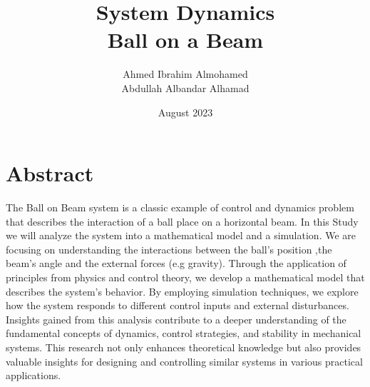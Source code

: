 \documentclass{article}
\title{System Dynamics \\ Ball on a Beam}
\author{Ahmed Ibrahim Almohamed \\  Abdullah Albandar Alhamad }
\date{August 2023}
\begin{document}
\tableofcontents
\maketitle
\makenomenclature
\section{Abstract}

The Ball on Beam system is a classic example of control and dynamics problem that describes
the interaction of a ball place on a horizontal beam.
In this Study we will analyze the system into a mathematical model and a simulation.
We are focusing on understanding the interactions between the ball's position ,the beam's angle
and the external forces (e.g gravity).
Through the application of principles from physics and control theory,
we develop a mathematical model that describes the system's behavior.
By employing simulation techniques, we explore how the system responds to different control inputs and external disturbances.
Insights gained from this analysis contribute to a deeper understanding of the fundamental concepts of dynamics, control strategies, and stability in mechanical systems.
This research not only enhances theoretical knowledge but also provides valuable insights for designing and controlling similar systems in various practical applications.

\newpage
\printnomenclature
\newpage
\end{document}
